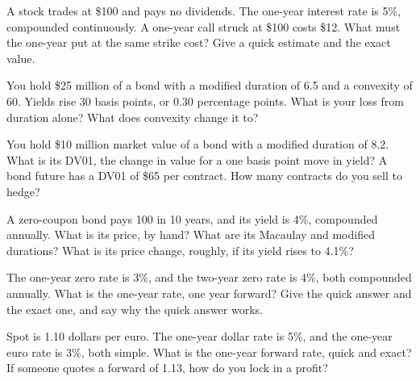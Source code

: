 \begin{question}\label{iq:iv2:options-and-bond-arithmetic-at-speed:5}
A stock trades at \$100 and pays no dividends. The one-year interest rate is 5\%, compounded continuously. A one-year call struck at \$100 costs \$12. What must the one-year put at the same strike cost? Give a quick estimate and the exact value.
\end{question}

\begin{question}\label{iq:iv2:options-and-bond-arithmetic-at-speed:6}
You hold \$25 million of a bond with a modified duration of 6.5 and a convexity of 60. Yields rise 30 basis points, or 0.30 percentage points. What is your loss from duration alone? What does convexity change it to?
\end{question}

\begin{question}\label{iq:iv2:options-and-bond-arithmetic-at-speed:7}
You hold \$10 million market value of a bond with a modified duration of 8.2. What is its DV01, the change in value for a one basis point move in yield? A bond future has a DV01 of \$65 per contract. How many contracts do you sell to hedge?
\end{question}

\begin{question}\label{iq:iv2:options-and-bond-arithmetic-at-speed:8}
A zero-coupon bond pays 100 in 10 years, and its yield is 4\%, compounded annually. What is its price, by hand? What are its Macaulay and modified durations? What is its price change, roughly, if its yield rises to 4.1\%?
\end{question}

\begin{question}\label{iq:iv2:options-and-bond-arithmetic-at-speed:9}
The one-year zero rate is 3\%, and the two-year zero rate is 4\%, both compounded annually. What is the one-year rate, one year forward? Give the quick answer and the exact one, and say why the quick answer works.
\end{question}

\begin{question}\label{iq:iv2:options-and-bond-arithmetic-at-speed:10}
Spot is 1.10 dollars per euro. The one-year dollar rate is 5\%, and the one-year euro rate is 3\%, both simple. What is the one-year forward rate, quick and exact? If someone quotes a forward of 1.13, how do you lock in a profit?
\end{question}

